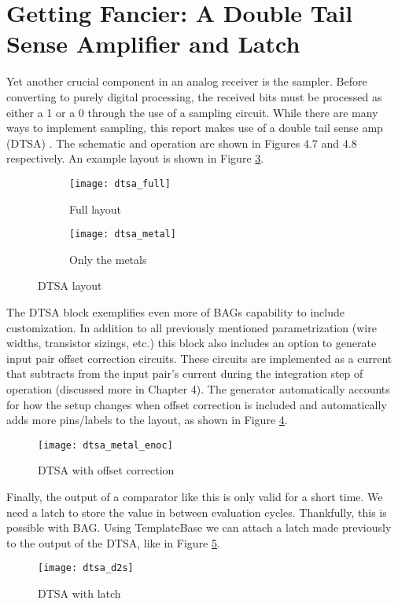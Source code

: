 \section{Getting Fancier: A Double Tail Sense Amplifier and Latch}
Yet another crucial component in an analog receiver is the sampler. Before converting to purely digital processing, the received bits must be processed as either a 1 or a 0 through the use of a sampling circuit. While there are many ways to implement sampling, this report makes use of a double tail sense amp (DTSA) \cite{chiu_double-tail_2016}. The schematic and operation are shown in Figures 4.7 and 4.8 respectively. An example layout is shown in Figure \ref{fig:dtsa_ex}.
\begin{figure}[h]
\centering
\begin{subfigure}{.4\linewidth}
  \centering
  \texttt{[image: dtsa\_full]}
  \caption{Full layout}
  \label{fig:sfig1}
\end{subfigure}
\begin{subfigure}{.4\linewidth}
  \centering
\texttt{[image: dtsa\_metal]}
  \caption{Only the metals}
  \label{fig:sfig2}
\end{subfigure}
\caption{DTSA layout}
\label{fig:dtsa_ex}
\end{figure}
The DTSA block exemplifies even more of BAGs capability to include customization. In addition to all previously mentioned parametrization (wire widths, transistor sizings, etc.) this block also includes an option to generate input pair offset correction circuits. These circuits are implemented as a current that subtracts from the input pair's current during the integration step of operation (discussed more in  Chapter 4). The generator automatically accounts for how the setup changes when offset correction is included and automatically adds more pins/labels to the layout, as shown in Figure \ref{fig:dtsa_enoc}.
\begin{figure}[h]
\centering
\texttt{[image: dtsa\_metal\_enoc]}
\caption{DTSA with offset correction}
\label{fig:dtsa_enoc}
\end{figure}
Finally, the output of a comparator like this is only valid for a short time. We need a latch to store the value in between evaluation cycles. Thankfully, this is possible with BAG. Using TemplateBase we can attach a latch made previously to the output of the DTSA, like in Figure \ref{fig:dtsa_d2s}.
\begin{figure}[h]
\centering
\texttt{[image: dtsa\_d2s]}
\caption{DTSA with latch}
\label{fig:dtsa_d2s}
\end{figure}

